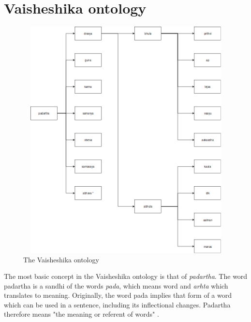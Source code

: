 \documentclass[final, 12pt]{elsarticle}
\begin{document}
\section{Vaisheshika ontology}
\label{sec: vai_ontology}

\begin{figure}[t]
    \centering
    \includegraphics[width=350pt, height=350pt]{Ontology.png}
    \caption{The Vaisheshika ontology}
    \label{fig: vai_onto_pic}
\end{figure}

The most basic concept in the Vaisheshika ontology is that of \emph{padartha}. The word padartha is a sandhi of the words \emph{pada}, which means word and \emph{arhta} which translates to meaning. Originally, the word pada implies that form of a word which can be used in a sentence, including its inflectional changes. Padartha therefore means "the meaning or referent of words" \cite{daniel1951materials}.
\end{document}
